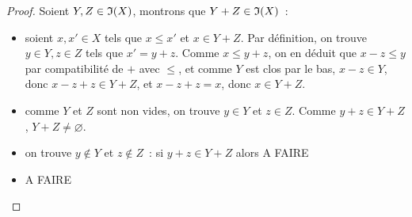 \begin{proof}
  Soient $Y,Z\in \mathfrak{I}(X)$, montrons que $Y + Z \in \mathfrak{I}(X)$~:
  \begin{itemize}
  \item soient $x,x'\in X$ tels que $x\leq x'$ et $x\in Y + Z$. Par définition,
    on trouve $y\in Y,z \in Z$ tels que $x' = y + z$. Comme $x \leq y + z$, on
    en déduit que $x - z \leq y$ par compatibilité de $+$ avec $\leq$, et comme
    $Y$ est clos par le bas, $x - z \in Y$, donc $x - z + z \in Y + Z$, et
    $x - z + z = x$, donc $x \in Y + Z$.
  \item comme $Y$ et $Z$ sont non vides, on trouve $y\in Y$ et $z\in Z$. Comme
    $y + z \in Y + Z$, $Y + Z \neq \varnothing$.
  \item on trouve $y\notin Y$ et $z\notin Z$~: si $y + z \in Y + Z$ alors
    A FAIRE
  \item A FAIRE
  \end{itemize}


\end{proof}
